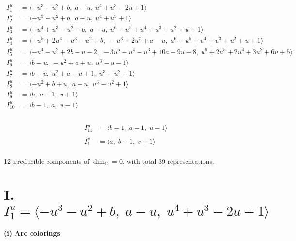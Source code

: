 \documentclass[1p]{elsarticle_modified}
\theoremstyle{definition}
\begin{document}
\begin{align*}
I^u_{1}&=\langle 
- u^3- u^2+b,\;a- u,\;u^4+u^3-2 u+1\rangle \\
I^u_{2}&=\langle 
- u^3- u^2+b,\;a- u,\;u^4+u^3+1\rangle \\
I^u_{3}&=\langle 
- u^4+u^3- u^2+b,\;a- u,\;u^6- u^5+u^4+u^3+u^2+u+1\rangle \\
I^u_{4}&=\langle 
- u^5+2 u^4- u^3- u^2+b,\;- u^3+2 u^2+a- u,\;u^6- u^5+u^4+u^3+u^2+u+1\rangle \\
I^u_{5}&=\langle 
- u^4- u^2+2 b- u-2,\;-3 u^5- u^4- u^3+10 a-9 u-8,\;u^6+2 u^5+2 u^4+3 u^2+6 u+5\rangle \\
I^u_{6}&=\langle 
b- u,\;- u^2+a+u,\;u^3- u-1\rangle \\
I^u_{7}&=\langle 
b- u,\;u^2+a- u+1,\;u^3- u^2+1\rangle \\
I^u_{8}&=\langle 
- u^2+b+u,\;a- u,\;u^3- u^2+1\rangle \\
I^u_{9}&=\langle 
b,\;a+1,\;u+1\rangle \\
I^u_{10}&=\langle 
b-1,\;a,\;u-1\rangle \\
\end{align*}\\
\begin{align*}
I^u_{11}&=\langle 
b-1,\;a-1,\;u-1\rangle \\
\\
I^v_{1}&=\langle 
a,\;b-1,\;v+1\rangle \\
\end{align*}
\raggedright * 12 irreducible components of $\dim_{\mathbb{C}}=0$, with total 39 representations.\\
\newpage
\renewcommand{\arraystretch}{1}
\centering \section*{I. $I^u_{1}= \langle - u^3- u^2+b,\;a- u,\;u^4+u^3-2 u+1 \rangle$}
\flushleft \textbf{(i) Arc colorings}\\
\end{document}
